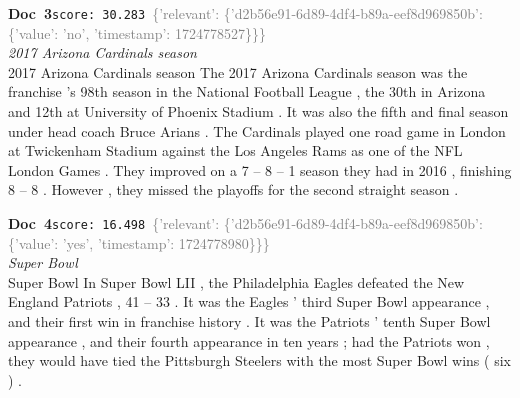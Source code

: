 \documentclass[a4paper,11pt]{article}
\begin{document}
\begin{docenv}
{\footnotesize\textcolor{doccolor}{\textbf{Doc~3}}}\hfill{\tiny\texttt{score:~30.283}}\ {\tiny\textcolor{gray}{\{'relevant': \{'d2b56e91-6d89-4df4-b89a-eef8d969850b': \{'value': 'no', 'timestamp': 1724778527\}\}\}}}\\[3pt]
{\small\textit{2017 Arizona Cardinals season}}\\[2pt]
\vspace{2pt}
{\footnotesize 2017 Arizona Cardinals season
The 2017 Arizona Cardinals season was the franchise 's 98th season in the National Football League , the 30th in Arizona and 12th at University of Phoenix Stadium . It was also the fifth and final season under head coach Bruce Arians . The Cardinals played one road game in London at Twickenham Stadium against the Los Angeles Rams as one of the NFL London Games . They improved on a 7 -- 8 -- 1 season they had in 2016 , finishing 8 -- 8 . However , they missed the playoffs for the second straight season .}
\end{docenv}
\begin{docenv}
{\footnotesize\textcolor{doccolor}{\textbf{Doc~4}}}\hfill{\tiny\texttt{score:~16.498}}\ {\tiny\textcolor{gray}{\{'relevant': \{'d2b56e91-6d89-4df4-b89a-eef8d969850b': \{'value': 'yes', 'timestamp': 1724778980\}\}\}}}\\[3pt]
{\small\textit{Super Bowl}}\\[2pt]
\vspace{2pt}
{\footnotesize Super Bowl
In Super Bowl LII , the Philadelphia Eagles defeated the New England Patriots , 41 -- 33 . It was the Eagles ' third Super Bowl appearance , and their first win in franchise history . It was the Patriots ' tenth Super Bowl appearance , and their fourth appearance in ten years ; had the Patriots won , they would have tied the Pittsburgh Steelers with the most Super Bowl wins ( six ) .}
\end{docenv}
\end{document}
